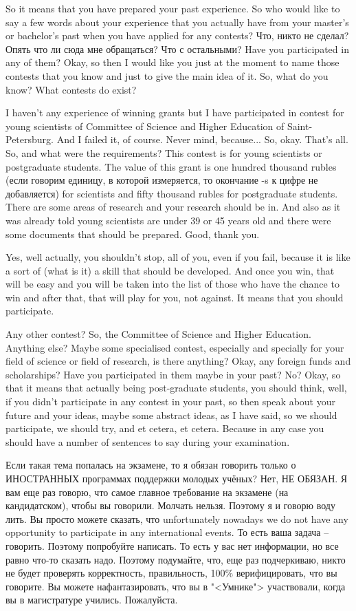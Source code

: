 \documentclass[main.tex]{subfiles}
\begin{document}
So it means that you have prepared your past experience.
So who would like to say a few words about your experience that you actually have from your master's or bachelor's past when you have applied for any contests?
Что, никто не сделал?
Опять что ли сюда мне обращаться?
Что с остальными?
Have you participated in any of them?
Okay, so then I would like you just at the moment to name those contests that you know and just to give the main idea of it.
So, what do you know?
What contests do exist?

I haven't any experience of winning grants but I have participated in contest for young scientists of Committee of Science and Higher Education of Saint-Petersburg.
And I failed it, of course.
Never mind, because...
So, okay.
That's all.
So, and what were the requirements?
This contest is for young scientists or postgraduate students.
The value of this grant is one hundred thousand rubles (если говорим единицу, в которой измеряется, то окончание -s к цифре не добавляется) for scientists and fifty thousand rubles for postgraduate students.
There are some areas of research and your research should be in.
And also as it was already told young scientists are under 39 or 45 years old and there were some documents that should be prepared.
Good, thank you.

Yes, well actually, you shouldn't stop, all of you, even if you fail, because it is like a sort of (what is it) a skill that should be developed.
And once you win, that will be easy and you will be taken into the list of those who have the chance to win and after that, that will play for you, not against.
It means that you should participate.

Any other contest?
So, the Committee of Science and Higher Education.
Anything else?
Maybe some specialised contest, especially and specially for your field of science or field of research, is there anything?
Okay, any foreign funds and scholarships?
Have you participated in them maybe in your past?
No?
Okay, so that it means that actually being post-graduate students, you should think, well, if you didn't participate in any contest in your past, so then speak about your future and your ideas, maybe some abstract ideas, as I have said, so we should participate, we should try, and et cetera, et cetera.
Because in any case you should have a number of sentences to say during your examination.

Если такая тема попалась на экзамене, то я обязан говорить только о ИНОСТРАННЫХ программах поддержки молодых учёных?
Нет, НЕ ОБЯЗАН.
Я вам еще раз говорю, что самое главное требование на экзамене (на кандидатском), чтобы вы говорили.
Молчать нельзя.
Поэтому я и говорю воду лить.
Вы просто можете сказать, что unfortunately nowadays we do not have any opportunity to participate in any international events.
То есть ваша задача -- говорить.
Поэтому попробуйте написать.
То есть у вас нет информации, но все равно что-то сказать надо.
Поэтому подумайте, что, еще раз подчеркиваю, никто не будет проверять корректность, правильность, 100\% верифицировать, что вы говорите.
Вы можете нафантазировать, что вы в "<Умнике"> участвовали, когда вы в магистратуре учились.
Пожалуйста.
\end{document}
